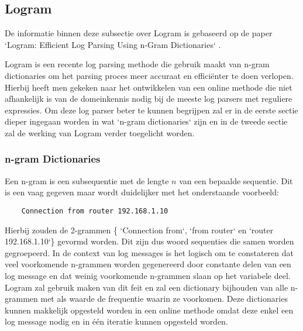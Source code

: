 \subsection{Logram}
De informatie binnen deze subsectie over Logram is gebaseerd op de paper `Logram: Efficient Log Parsing Using n-Gram Dictionaries` \autocite{dai2020logram}. 

Logram is een recente log parsing methode die gebruik maakt van n-gram dictionaries om het parsing proces meer accuraat en efficiënter te doen verlopen. Hierbij heeft men gekeken naar het ontwikkelen van een online methode die niet afhankelijk is van de domeinkennis nodig bij de meeste log parsers met reguliere expressies. Om deze log parser beter te kunnen begrijpen zal er in de eerste sectie dieper ingegaan worden in wat `n-gram dictionaries` zijn en in de tweede sectie zal de werking van Logram verder toegelicht worden.

\subsubsection{n-gram Dictionaries}
Een n-gram is een subsequentie met de lengte $n$ van een bepaalde sequentie. Dit is een vaag gegeven maar wordt duidelijker met het onderstaande voorbeeld:
\begin{verbatim}
    Connection from router 192.168.1.10
\end{verbatim}
Hierbij zouden de 2-grammen \{ `Connection from`,  `from router` en `router 192.168.1.10`\} gevormd worden. Dit zijn dus woord sequenties die samen worden gegroepeerd. In de context van log messages is het logisch om te constateren dat veel voorkomende n-grammen worden gegenereerd door constante delen van een log message en dat weinig voorkomende n-grammen slaan op het variabele deel. Logram zal gebruik maken van dit feit en zal een dictionary bijhouden van alle n-grammen met als waarde de frequentie waarin ze voorkomen. Deze dictionaries kunnen makkelijk opgesteld worden in een online methode omdat deze enkel een log message nodig en in één iteratie kunnen opgesteld worden.

